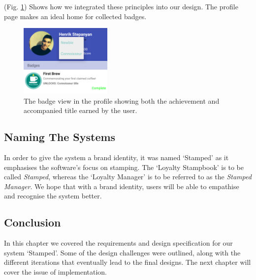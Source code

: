 (Fig. \ref{fig:badge}) Shows how we integrated these principles into our design. The profile page makes an ideal home for collected badges.

\begin{figure}[H]
 \centering
  \includegraphics[width=0.40\textwidth]{img/badge.png}
     \caption{The badge view in the profile showing both the achievement and accompanied title earned by the user.}
     \label{fig:badge}
\end{figure}
\subsection{Naming The Systems}
In order to give the system a brand identity, it was named `Stamped' as it emphasises the software's focus on stamping. The `Loyalty Stampbook' is to be called \emph{Stamped}, whereas the `Loyalty Manager' is to be referred to as the \emph{Stamped Manager}. We hope that with a brand identity, users will be able to empathise and recognise the system better.
\subsection{Conclusion}
In this chapter we covered the requirements and design specification for our system `Stamped'. Some of the design challenges were outlined, along with the different iterations that eventually lead to the final designs. The next chapter will cover the issue of implementation.
